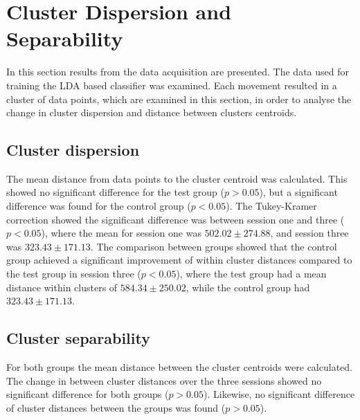 \section{Cluster Dispersion and Separability}
In this section results from the data acquisition are presented. The data used for training the LDA based classifier was examined. Each movement resulted in a cluster of data points, which are examined in this section, in order to analyse the change in cluster dispersion and distance between clusters centroids.

\subsection{Cluster dispersion}
The mean distance from data points to the cluster centroid was calculated. This showed no significant difference for the test group ($p > 0.05$), but a significant difference was found for the control group ($p < 0.05$). The Tukey-Kramer correction showed the significant difference was between session one and three ($p < 0.05$), where the mean for session one was $502.02 \pm 274.88$, and session three was $323.43 \pm 171.13$. The comparison between groups showed that the control group achieved a significant improvement of within cluster distances compared to the test group in session three ($p < 0.05$), where the test group had a mean distance within clusters of $584.34 \pm 250.02$, while the control group had $323.43 \pm 171.13$.

\subsection{Cluster separability}
For both groups the mean distance between the cluster centroids were calculated. The change in between cluster distances over the three sessions showed no significant difference for both groups ($p > 0.05$). Likewise, no significant difference of cluster distances between the groups was found ($p > 0.05$).\\


